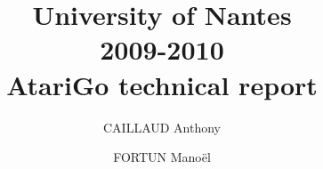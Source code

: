 \documentclass[12pt,a4paper,utf8x]{report}
\title
{
	\normalsize{
	University of Nantes\\
	2009-2010}\\
	\vspace{15mm}
	\Huge{AtariGo technical report}
}
\author{CAILLAUD Anthony \and FORTUN Manoël \\
	\vspace{45mm}
}
\begin{document}
\maketitle

\tableofcontents
\clearpage

\begin{onehalfspace}













\end{onehalfspace}

\nocite{*}




\printindex

\appendix
\end{document}
